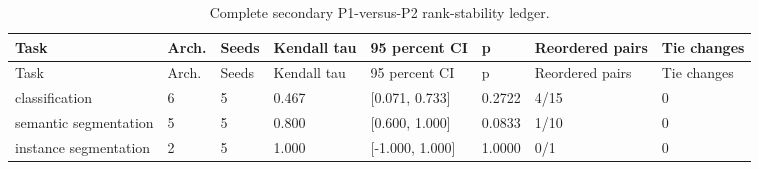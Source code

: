 \begin{longtable}{p{3.2cm}p{1.3cm}p{1.0cm}p{1.7cm}p{2.3cm}p{1.2cm}p{1.8cm}p{1.4cm}}
\caption{Complete secondary P1-versus-P2 rank-stability ledger.}\label{s1:tab:all-rank-results}\\
\toprule
Task & Arch. & Seeds & Kendall tau & 95 percent CI & p & Reordered pairs & Tie changes \\
\midrule
\endfirsthead
\toprule
Task & Arch. & Seeds & Kendall tau & 95 percent CI & p & Reordered pairs & Tie changes \\
\midrule
\endhead
\bottomrule
\endfoot
classification & 6 & 5 & 0.467 & [0.071, 0.733] & 0.2722 & 4/15 & 0 \\ 
semantic segmentation & 5 & 5 & 0.800 & [0.600, 1.000] & 0.0833 & 1/10 & 0 \\ 
instance segmentation & 2 & 5 & 1.000 & [-1.000, 1.000] & 1.0000 & 0/1 & 0 \\ 
\end{longtable}
